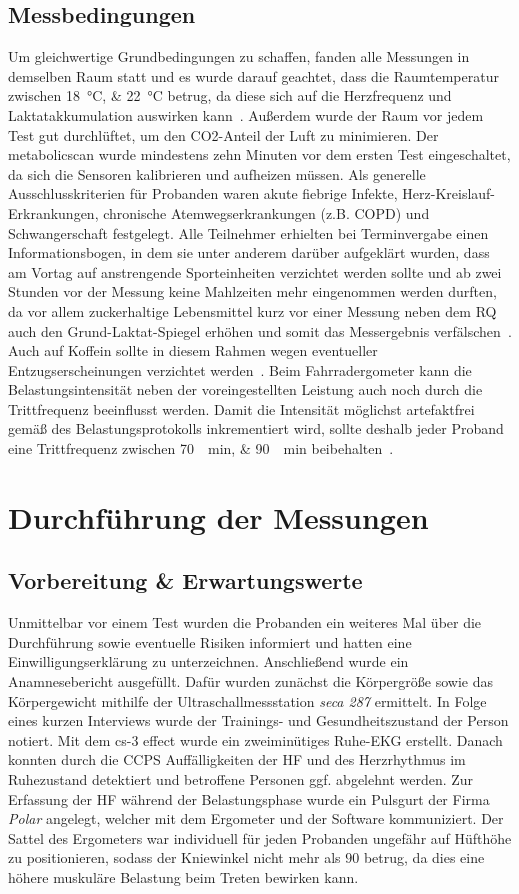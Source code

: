 \subsection{Messbedingungen}
%
Um gleichwertige Grundbedingungen zu schaffen, fanden alle Messungen in demselben Raum statt und es wurde darauf geachtet, dass die Raumtemperatur zwischen \SIlist{18;22}{\degreeCelsius} betrug, da diese sich auf die Herzfrequenz und Laktatakkumulation auswirken kann~\cite{Marino.2001}. Außerdem wurde der Raum vor jedem Test gut durchlüftet, um den \gls{CO2}-Anteil der Luft zu minimieren. Der metabolicscan wurde mindestens zehn Minuten vor dem ersten Test eingeschaltet, da sich die Sensoren kalibrieren und aufheizen müssen.
Als generelle Ausschlusskriterien für Probanden waren akute fiebrige Infekte, Herz-Kreislauf-Erkrankungen, chronische Atemwegserkrankungen (z.B. COPD) und Schwangerschaft festgelegt. Alle Teilnehmer erhielten bei Terminvergabe einen Informationsbogen, in dem sie unter anderem darüber aufgeklärt wurden, dass am Vortag auf anstrengende Sporteinheiten verzichtet werden sollte und ab zwei Stunden vor der Messung keine Mahlzeiten mehr eingenommen werden durften, da vor allem zuckerhaltige Lebensmittel kurz vor einer Messung neben dem RQ auch den Grund-Laktat-Spiegel erhöhen und somit das Messergebnis verfälschen~\cite{Ivy.1981}. Auch auf Koffein sollte in diesem Rahmen wegen eventueller Entzugserscheinungen verzichtet werden~\cite{Kroidl.2015}. Beim Fahrradergometer kann die Belastungsintensität neben der voreingestellten Leistung auch noch durch die Trittfrequenz beeinflusst werden. Damit die Intensität möglichst artefaktfrei gemäß des Belastungsprotokolls inkrementiert wird, sollte deshalb jeder Proband eine Trittfrequenz zwischen \SIlist{70;90}{\per\minute} beibehalten~\cite{Wonisch.2008}.
%
\section{Durchführung der Messungen}
%
\subsection{Vorbereitung \& Erwartungswerte}
%
Unmittelbar vor einem Test wurden die Probanden ein weiteres Mal über die Durchführung sowie eventuelle Risiken informiert und hatten eine Einwilligungserklärung zu unterzeichnen. Anschließend wurde ein Anamnesebericht ausgefüllt. Dafür wurden zunächst die Körpergröße sowie das Körpergewicht mithilfe der Ultraschallmessstation \textsl{seca 287} ermittelt. In Folge eines kurzen Interviews wurde der Trainings- und Gesundheitszustand der Person notiert. Mit dem cs-3 effect wurde ein zweiminütiges Ruhe-\gls{EKG} erstellt. Danach konnten durch die \gls{CCPS} Auffälligkeiten der \gls{HF} und des Herzrhythmus im Ruhezustand detektiert und betroffene Personen ggf. abgelehnt werden. Zur Erfassung der \gls{HF} während der Belastungsphase wurde ein Pulsgurt der Firma \textsl{Polar} angelegt, welcher mit dem Ergometer und der Software kommuniziert. Der Sattel des Ergometers war individuell für jeden Probanden ungefähr auf Hüfthöhe zu positionieren, sodass der Kniewinkel nicht mehr als $90$ \textdegree{} betrug, da dies eine höhere muskuläre Belastung beim Treten bewirken kann.
%
